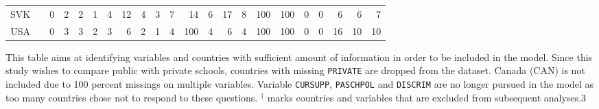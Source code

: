 {\begin{tabular}{ccrrrrrrrrrrrrrrrrrrrr}
      SVK   &       & 0     & \cellcolor[rgb]{ 1,  .98,  .98}2 & \cellcolor[rgb]{ 1,  .98,  .98}2 & \cellcolor[rgb]{ 1,  .988,  .988}1 & \cellcolor[rgb]{ 1,  .961,  .961}4 & \cellcolor[rgb]{ 1,  .886,  .886}12 & \cellcolor[rgb]{ 1,  .965,  .965}4 & \cellcolor[rgb]{ 1,  .976,  .976}3 & \cellcolor[rgb]{ 1,  .929,  .929}7 & \cellcolor[rgb]{ 1,  .859,  .859}14 & \cellcolor[rgb]{ 1,  .945,  .945}6 & \cellcolor[rgb]{ 1,  .831,  .831}17 & \cellcolor[rgb]{ 1,  .922,  .922}8 & \cellcolor[rgb]{ 1,  0,  0}100 & \cellcolor[rgb]{ 1,  0,  0}100 & 0     & 0     & \cellcolor[rgb]{ 1,  .937,  .937}6 & \cellcolor[rgb]{ 1,  .945,  .945}6 & \cellcolor[rgb]{ 1,  .929,  .929}7 \\
      USA   &       & 0     & \cellcolor[rgb]{ 1,  .976,  .976}3 & \cellcolor[rgb]{ 1,  .976,  .976}3 & \cellcolor[rgb]{ 1,  .984,  .984}2 & \cellcolor[rgb]{ 1,  .973,  .973}3 & \cellcolor[rgb]{ 1,  .945,  .945}6 & \cellcolor[rgb]{ 1,  .984,  .984}2 & \cellcolor[rgb]{ 1,  .988,  .988}1 & \cellcolor[rgb]{ 1,  .965,  .965}4 & \cellcolor[rgb]{ 1,  0,  0}100 & \cellcolor[rgb]{ 1,  .965,  .965}4 & \cellcolor[rgb]{ 1,  .945,  .945}6 & \cellcolor[rgb]{ 1,  .957,  .957}4 & \cellcolor[rgb]{ 1,  0,  0}100 & \cellcolor[rgb]{ 1,  0,  0}100 & 0     & 0     & \cellcolor[rgb]{ 1,  .847,  .847}16 & \cellcolor[rgb]{ 1,  .906,  .906}10 & \cellcolor[rgb]{ 1,  .906,  .906}10 \\
      \bottomrule
      \end{tabular}
}{This table aims at identifying variables and countries with sufficient amount of information in order to be included in the model. Since this study wishes to compare public with private schools, countries with missing \texttt{PRIVATE} are dropped from the dataset. Canada (CAN) is not included due to 100 percent missings on multiple variables. Variable \texttt{CURSUPP}, \texttt{PASCHPOL} and \texttt{DISCRIM} are no longer pursued in the model as too many countries chose not to respond to these questions. $^\dagger$ marks countries and variables that are excluded from subsequent analyses.}{3}